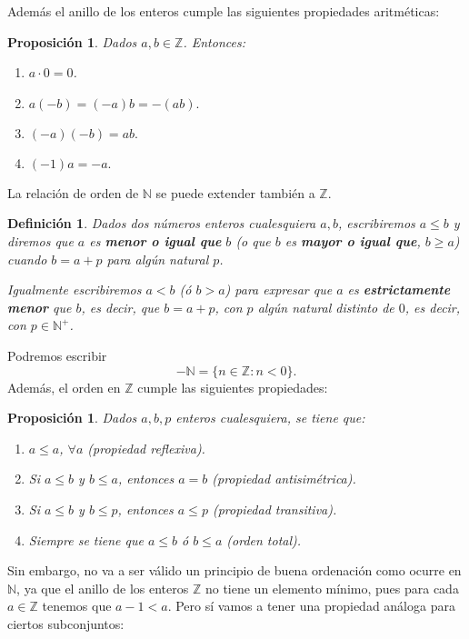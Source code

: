 \documentclass[12pt]{article}
\newtheorem{proposition}[theorem]{Proposición}
\newtheorem{definition}[theorem]{Definición}
\begin{document}
Además el anillo de los enteros cumple las siguientes propiedades aritméticas: 

\begin{proposition}Dados $a, b \in \mathbb{Z}$. Entonces: 
\begin{enumerate}
\item $a \cdot 0 = 0$.
\item $a(-b)= (-a)b= -(ab).$
\item $(-a)(-b)=ab.$
\item $(-1)a = -a.$
\end{enumerate}
\end{proposition}

La relación de orden de $\mathbb{N}$ se puede extender también a $\mathbb{Z}$.

\begin{definition}Dados dos números enteros cualesquiera $a,b$, escribiremos $a \leq b$ y diremos que $a$ es \textbf{menor o igual que} $b$ (o que $b$ es \textbf{mayor o igual que}, $b \geq a$) cuando $b = a+p$ para algún natural $p$.

Igualmente escribiremos $a< b$ (ó $b> a$) para expresar que $a$ es \textbf{estrictamente menor} que $b$, es decir, que $b = a +p$, con $p$ algún natural distinto de $0$, es decir, con $p \in \mathbb{N}^+$.
\end{definition} 

Podremos escribir $$- \mathbb{N} = \lbrace n \in \mathbb{Z}: n < 0 \rbrace.$$
Además, el orden en $\mathbb{Z}$ cumple las siguientes propiedades: 

\begin{proposition}Dados $a,b,p$ enteros cualesquiera, se tiene que:
\begin{enumerate}
\item $a \leq a$, $\forall a$ (propiedad reflexiva).
\item Si $a \leq b$ y $b \leq a$, entonces $a = b$ (propiedad antisimétrica).
\item Si $a \leq b$ y $b \leq p$, entonces $a \leq p$ (propiedad transitiva).
\item Siempre se tiene que $a \leq b$ ó $b \leq a$ (orden total).
\end{enumerate}
\end{proposition}

Sin embargo, no va a ser válido un principio de buena ordenación como ocurre en $\mathbb{N}$, ya que el anillo de los enteros $\mathbb{Z}$ no tiene un elemento mínimo, pues para cada $a \in \mathbb{Z}$ tenemos que $a-1 < a$. Pero sí vamos a tener una propiedad análoga para ciertos subconjuntos:
\end{document}
